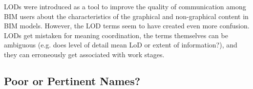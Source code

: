 LODs were introduced as a tool to improve the quality of communication among BIM users about the characteristics of the graphical and non-graphical content in BIM models.
However, the LOD terms seem to have created even more confusion.
LODs get mistaken for meaning coordination, the terms themselves can be ambiguous (e.g. does level of detail mean LoD or extent of information?), and they can erroneously get associated with work stages.
\begin{comment}
\begin{itemize}
	\item People mistaking LODs for coordination
	\item Association with work stages
		\begin{itemize}
			\item No clear coherence in various industry guidance documents
			\item Same numbers in UK and similar in USA (2, 3, 4 etc.)
			\item Blanket value issue
			\item Employers' misunderstanding/ confusion
		\end{itemize}
	\item Terms themselves are ambiguous (level of detail - LoD or extent of info?)
\end{itemize}

Don't actually know whether clients typically comply with industry guidance regarding setting LODs at start of projects.
However, I've been told on more than one occasion (\cite{Quigley2017} and Jon) that there is a range in clients' and/ or contractors' understanding of LODs, and thus a large range in the quality of EIRs.

PAS 1192-2, BG 6 and the NBS article were respectively published in 2013, 2014 and 2015, whereas CIBSE DE2 and the ACE Schedule of Services MEP were respectively published in 2016 and 2017.
There appears to be a correlation between the publication dates of these documents and their guidance on whether LODs are work stage related.
This may suggest that the industry realised in 2016 that LODs should not be work stage related.
More recent publications by BSI, BSRIA and NBS might confirm this speculation.
\end{comment}



\subsection{Poor or Pertinent Names?}

